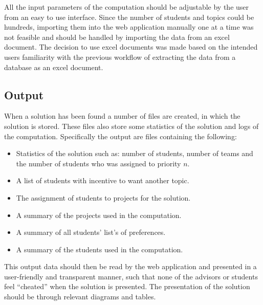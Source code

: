 All the input parameters of the computation should be adjustable by the user from an easy to use interface.
Since the number of students and topics could be hundreds, importing them into the web application manually one at a time was not feasible and should be handled by importing the data from an excel document. The decision to use excel documents was made based on the intended users familiarity with the previous workflow of extracting the data from a database as an excel document.

\subsection{Output}\label{algo_out}
When a solution has been found a number of files are created, in which the solution is stored. These files also store some statistics of the solution and logs of the computation. Specifically the output are files containing the following:
\begin{itemize}
	\item Statistics of the solution such as: number of students, number of teams and the number of students who was assigned to priority $n$.
	\item A list of students with incentive to want another topic.
	\item The assignment of students to projects for the solution.
	\item A summary of the projects used in the computation.
	\item A summary of all students' list's of preferences.
	\item A summary of the students used in the computation.
\end{itemize}
This output data should then be read by the web application and presented in a user-friendly and transparent manner, such that none of the advisors or students feel ``cheated'' when the solution is presented. The presentation of the solution should be through relevant diagrams and tables.